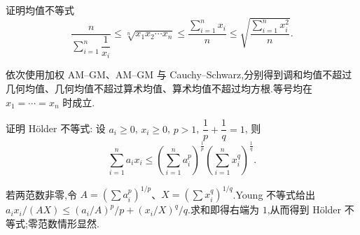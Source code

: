 \begin{example}[\markstar]
    证明均值不等式
    \[
        \dfrac{n}{\displaystyle\sum\limits_{i=1}^n\dfrac{1}{x_i}}
        \leq\sqrt[n]{x_1x_2\cdots x_n}
        \leq\dfrac{\displaystyle\sum\limits_{i=1}^n x_i}{n}
        \leq\sqrt{\dfrac{\displaystyle\sum\limits_{i=1}^n x_i^2}{n}}.
    \]
\end{example}
\exampleblank

\begin{solution}
    依次使用加权 AM--GM、AM--GM 与 Cauchy--Schwarz,分别得到调和均值不超过几何均值、几何均值不超过算术均值、算术均值不超过均方根.等号均在 $x_1=\cdots=x_n$ 时成立.
\end{solution}

\begin{example}[\markstar]
    证明 H\"older 不等式: 设 $a_i\geq0$, $x_i\geq0$, $p>1$, $\dfrac{1}{p}+\dfrac{1}{q}=1$, 则
    \[
        \sum\limits_{i=1}^na_ix_i
        \leq\left(\sum\limits_{i=1}^na_i^p\right)^{\frac{1}{p}}
        \left(\sum\limits_{i=1}^nx_i^q\right)^{\frac{1}{q}}.
    \]
\end{example}
\exampleblank

\begin{solution}
    若两范数非零,令 $A=(\sum a_i^p)^{1/p}$、$X=(\sum x_i^q)^{1/q}$.Young 不等式给出
    $a_ix_i/(AX)\leq (a_i/A)^p/p+(x_i/X)^q/q$.求和即得右端为 $1$,从而得到 H\"older 不等式;零范数情形显然.
\end{solution}
